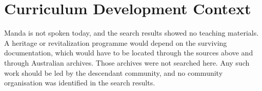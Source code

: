 \documentclass[12pt]{article}
\begin{document}
\section{Curriculum Development Context}
Manda is not spoken today, and the search results showed no teaching materials. A heritage or revitalization programme would depend on the surviving documentation, which would have to be located through the sources above and through Australian archives. Those archives were not searched here. Any such work should be led by the descendant community, and no community organisation was identified in the search results.
\end{document}
